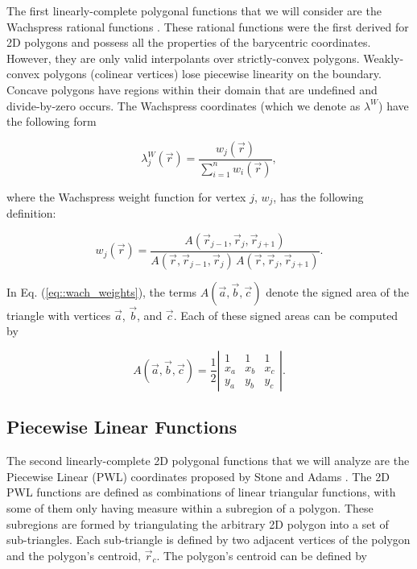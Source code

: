 \documentclass[preprint,10pt]{elsarticle}
\begin{document}
The first linearly-complete polygonal functions that we will consider are the Wachspress rational functions \cite{wachspress1975rational}. These rational functions were the first derived for 2D polygons and possess all the properties of the barycentric coordinates. However, they are only valid interpolants over strictly-convex polygons. Weakly-convex polygons (colinear vertices) lose piecewise linearity on the boundary. Concave polygons have regions within their domain that are undefined and divide-by-zero occurs. The Wachspress coordinates (which we denote as $\lambda^W$) have the following form

\begin{equation}
\label{eq::wach_BF}
\lambda_{j}^{W} (\vec{r}) = \frac{w_j (\vec{r}) }{\sum\limits_{i=1}^{n} w_i (\vec{r})},
\end{equation}

\noindent where the Wachspress weight function for vertex $j$, $w_j$, has the following definition:

\begin{equation}
\label{eq::wach_weights}
w_j (\vec{r})  = \frac{A(\vec{r}_{j-1}, \vec{r}_{j}, \vec{r}_{j+1})}{A(\vec{r}, \vec{r}_{j-1}, \vec{r}_{j}) \, A(\vec{r}, \vec{r}_{j}, \vec{r}_{j+1})} .
\end{equation}

\noindent In Eq. (\ref{eq::wach_weights}), the terms $A(\vec{a}, \vec{b}, \vec{c})$ denote the signed area of the triangle with vertices $\vec{a}$, $\vec{b}$, and $\vec{c}$. Each of these signed areas can be computed by

\begin{equation}
\label{eq::wach_signed_area}
A(\vec{a}, \vec{b}, \vec{c}) = \frac{1}{2}
\left|  
  \begin{array}{ccc}
  1 & 1 & 1 \\
  x_a & x_b & x_c \\
  y_a & y_b & y_c
  \end{array}
\right| .
\end{equation}

\subsection{Piecewise Linear Functions}

The second linearly-complete 2D polygonal functions that we will analyze are the Piecewise Linear (PWL) coordinates proposed by Stone and Adams \cite{ref::PWLD_stone_adams,ref::PWLD_stone_adams_unstructured}. The 2D PWL functions are defined as combinations of linear triangular functions, with some of them only having measure within a subregion of a polygon. These subregions are formed by triangulating the arbitrary 2D polygon into a set of sub-triangles.  Each sub-triangle is defined by two adjacent vertices of the polygon and the polygon's centroid, $\vec{r}_{c}$. The polygon's centroid can be defined by
\end{document}
